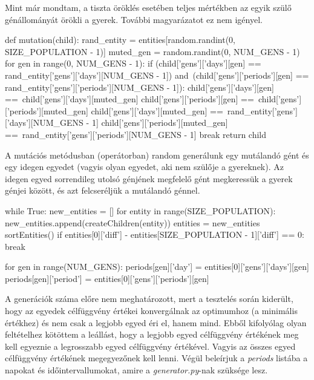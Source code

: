 Mint már mondtam, a tiszta öröklés esetében teljes mértékben az egyik szülő génállományát örökli a gyerek. További magyarázatot ez nem igényel.

\begin{python}
	def mutation(child):
	rand_entity = entities[random.randint(0, SIZE_POPULATION - 1)]
	muted_gen = random.randint(0, NUM_GENS - 1)
	for gen in range(0, NUM_GENS - 1):
	if (child['gens']['days'][gen] ==
	rand_entity['gens']['days'][NUM_GENS - 1]) and\
	(child['gens']['periods'][gen] ==
	rand_entity['gens']['periods'][NUM_GENS - 1]):
	child['gens']['days'][gen] ==\
	child['gens']['days'][muted_gen]
	child['gens']['periods'][gen] ==\
	child['gens']['periods'][muted_gen]
	child['gens']['days'][muted_gen] ==\
	rand_entity['gens']['days'][NUM_GENS - 1]
	child['gens']['periods'][muted_gen] ==\
	rand_entity['gens']['periods'][NUM_GENS - 1]
	break
	return child
\end{python}

A mutációs metódusban (operátorban) random generálunk egy mutálandó gént és egy idegen egyedet (vagyis olyan egyedet, aki nem szülője a gyereknek). Az idegen egyed sorrendileg utolsó génjének megfelelő gént megkeressük a gyerek génjei között, és azt felcseréljük a mutálandó génnel.

\begin{python}
	while True:
	new_entities = []
	for entity in range(SIZE_POPULATION):
	new_entities.append(createChildren(entity))
	entities = new_entities
	sortEntities()
	if entities[0]['diff'] - entities[SIZE_POPULATION - 1]['diff'] == 0:
	break
	
	for gen in range(NUM_GENS):
	periods[gen]['day'] = entities[0]['gens']['days'][gen]
	periods[gen]['period'] = entities[0]['gens']['periods'][gen]
\end{python}

A generációk száma előre nem meghatározott, mert a tesztelés során kiderült, hogy az egyedek célfüggvény értékei konvergálnak az optimumhoz (a minimális értékhez) és nem csak a legjobb egyed éri el, hanem mind. Ebből kifolyólag olyan feltételhez kötöttem a leállást, hogy a legjobb egyed célfüggvény értékének meg kell egyeznie a legrosszabb egyed célfüggvény értékével. Vagyis az összes egyed célfüggvény értékének megegyezőnek kell lenni. Végül beleírjuk a \textit{periods} listába a napokat és időintervallumokat, amire a \textit{generator.py}-nak szüksége lesz.

\Section{Adatbázis}

